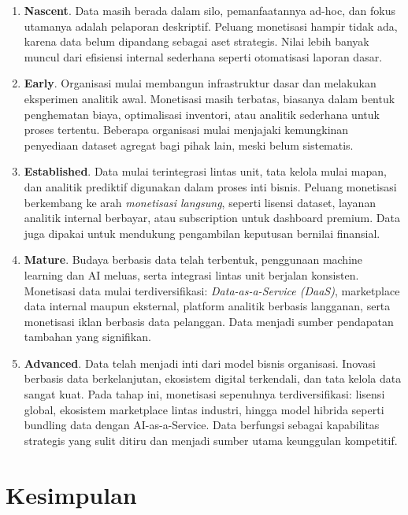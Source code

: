 \begin{enumerate}
	\item \textbf{Nascent}. Data masih berada dalam silo, pemanfaatannya ad-hoc, dan fokus utamanya adalah pelaporan deskriptif. 
	Peluang monetisasi hampir tidak ada, karena data belum dipandang sebagai aset strategis. Nilai lebih banyak muncul dari efisiensi internal sederhana seperti otomatisasi laporan dasar.
	
	\item \textbf{Early}.
	Organisasi mulai membangun infrastruktur dasar dan melakukan eksperimen analitik awal. 
	Monetisasi masih terbatas, biasanya dalam bentuk penghematan biaya, optimalisasi inventori, atau analitik sederhana untuk proses tertentu. Beberapa organisasi mulai menjajaki kemungkinan penyediaan dataset agregat bagi pihak lain, meski belum sistematis.
	
	\item \textbf{Established}.
	Data mulai terintegrasi lintas unit, tata kelola mulai mapan, dan analitik prediktif digunakan dalam proses inti bisnis. 
	Peluang monetisasi berkembang ke arah \textit{monetisasi langsung}, seperti lisensi dataset, layanan analitik internal berbayar, atau subscription untuk dashboard premium. Data juga dipakai untuk mendukung pengambilan keputusan bernilai finansial.
	
	\item \textbf{Mature}.
	Budaya berbasis data telah terbentuk, penggunaan machine learning dan AI meluas, serta integrasi lintas unit berjalan konsisten. 
	Monetisasi data mulai terdiversifikasi: \textit{Data-as-a-Service (DaaS)}, marketplace data internal maupun eksternal, platform analitik berbasis langganan, serta monetisasi iklan berbasis data pelanggan. Data menjadi sumber pendapatan tambahan yang signifikan.
	
	\item \textbf{Advanced}.
	Data telah menjadi inti dari model bisnis organisasi. Inovasi berbasis data berkelanjutan, ekosistem digital terkendali, dan tata kelola data sangat kuat. 
	Pada tahap ini, monetisasi sepenuhnya terdiversifikasi: lisensi global, ekosistem marketplace lintas industri, hingga model hibrida seperti bundling data dengan AI-as-a-Service. Data berfungsi sebagai kapabilitas strategis yang sulit ditiru dan menjadi sumber utama keunggulan kompetitif.
\end{enumerate}



\section{Kesimpulan}


